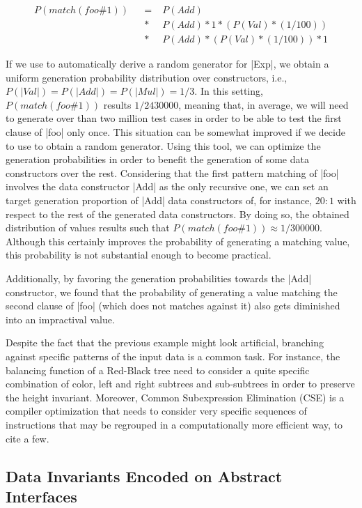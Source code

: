 \begin{align*}
  P(match(foo\#1))
  \!&&=\; &P(Add) \\
  \!&&*\; &P(Add) * 1 * (P(Val) * (1/100)) \\
  \!&&*\; &P(Add) * (P(Val) * (1/100)) * 1
\end{align*}

If we use \megadeth to automatically derive a random generator for |Exp|, we
obtain a uniform generation probability distribution over constructors, i.e.,
$P(|Val|) = P(|Add|) = P(|Mul|) = 1/3$.
%
In this setting, $P(match(foo\#1))$ results $1/2430000$, meaning that, in
average, we will need to generate over than two million test cases in order to
be able to test the first clause of |foo| only once.
%
This situation can be somewhat improved if we decide to use \dragen to obtain a
random generator.
%
Using this tool, we can optimize the generation probabilities in order to
benefit the generation of some data constructors over the rest.
%
Considering that the first pattern matching of |foo| involves the data
constructor |Add| as the only recursive one, we can set an target generation
proportion of |Add| data constructors of, for instance, $20:1$ with respect to
the rest of the generated data constructors.
%
By doing so, the obtained distribution of values results such that
$P(match(foo\#1)) \approx 1/300000$.
%
Although this certainly improves the probability of generating a matching value,
this probability is not substantial enough to become practical.


Additionally, by favoring the generation probabilities towards the |Add|
constructor, we found that the probability of generating a value matching the
second clause of |foo| (which does not matches against it) also gets diminished
into an impractival value.


Despite the fact that the previous example might look artificial, branching
against specific patterns of the input data is a common task.
%
For instance, the balancing function of a Red-Black tree need to consider a
quite specific combination of color, left and right subtrees and sub-subtrees
in order to preserve the height invariant.
%
Moreover, Common Subexpression Elimination (CSE) is a compiler optimization that
needs to consider very specific sequences of instructions that may be regrouped
in a computationally more efficient way, to cite a few.



\subsection{\textbf{Data Invariants Encoded on Abstract Interfaces}}

